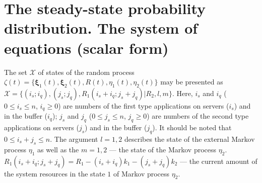 {%

\section{The steady-state probability distribution. The system of
  equations (scalar form)}
\label{sec:base-steady}

The set $\mathcal{X}$ of states of the random process
$\zeta(t)=\{\mathbf{\xi}_1 (t), \mathbf{\xi}_2 (t),R(t),\eta_1
(t),\eta_2 (t)\}$ may be presented as
$\mathcal{X}=\{(i_s; i_q),(j_s; j_q),R_1(i_s+i_q;j_s+j_q)|R_2,l,m\}$.
Here, $i_s$ and $i_q$ ($0\leqslant i_s\leqslant n$, $i_q\geqslant 0$)
are numbers of the first type applications on servers ($i_s$) and in
the buffer ($i_q$); $j_s$ and $j_q$ ($0\leqslant j_s\leqslant n$,
$j_q\geqslant 0$) are numbers of the second type applications on
servers ($j_s$) and in the buffer ($j_q$).  It should be noted that
$0\leqslant i_s + j_s\leqslant n$. The argument $l=1,2$ describes the
state of the external Markov process $\eta_1$ as well as the $m=1,2$
--- the state of the Markov process
$\eta_2$. $R_1(i_s+i_q;j_s+j_q)=R_1-(i_s+i_q)k_1-(j_s+j_q)k_2$ --- the
current amount of the system resources in the state $1$ of Markov
process $\eta_2$.


}
